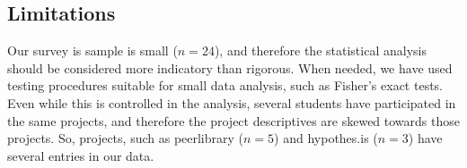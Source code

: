 \subsection{Limitations}

Our survey is sample is small ($n=24$), and therefore the statistical analysis should be considered more indicatory than rigorous. When needed, we have used testing procedures suitable for small data analysis, such as Fisher's exact tests. Even while this is controlled in the analysis, several students have participated in the same projects, and therefore the project descriptives are skewed towards those projects. So, projects, such as peerlibrary ($n=5$) and hypothes.is ($n=3$) have several entries in our data.
